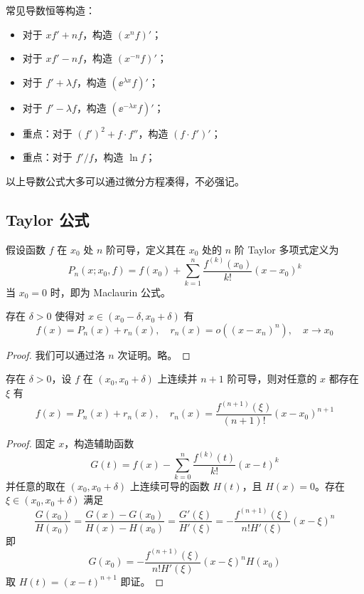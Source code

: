 常见导数恒等构造：
\begin{itemize}
	\item 对于 $x f' + n f$，构造 $(x^n f)'$；
	\item 对于 $xf' - nf$，构造 $(x^{-n} f)'$；
	\item 对于 $f' + \lambda f$，构造 $(\ee^{\lambda x} f)'$；
	\item 对于 $f' - \lambda f$，构造 $(\ee^{-\lambda x} f)'$；
	\item 重点：对于 $(f')^2 + f \cdot f''$，构造 $(f \cdot f')'$；
	\item 重点：对于 $f'/f$，构造 $\ln f$；
\end{itemize}
以上导数公式大多可以通过微分方程凑得，不必强记。

\subsection{Taylor 公式}

假设函数 $f$ 在 $x_0$ 处 $n$ 阶可导，定义其在 $x_0$ 处的 $n$ 阶 Taylor 多项式定义为
\[ P_n(x;x_0, f) = f(x_0) + \sum_{k=1}^{n} \frac{f^{(k)}(x_0)}{k!} (x-x_0)^k \]
当 $x_0 = 0$ 时，即为 Maclaurin 公式。

\begin{theorem}
	存在 $\delta > 0$ 使得对 $x \in (x_0 - \delta, x_0 + \delta)$ 有
	\[ f(x) = P_n(x) + r_n(x), \quad r_n(x) = o((x-x_n)^n), \quad x \to x_0 \]
\end{theorem}

\begin{proof}
	我们可以通过洛 $n$ 次证明。略。
\end{proof}

\begin{theorem}
	存在 $\delta > 0$，设 $f$ 在 $(x_0, x_0+\delta)$ 上连续并 $n + 1$ 阶可导，则对任意的 $x$ 都存在 $\xi$ 有
	\[ f(x) = P_n(x) + r_n(x), \quad r_n(x) = \frac{f^{(n+1)}(\xi)}{(n+1)!}(x-x_0)^{n+1} \]
\end{theorem}

\begin{proof}
	固定 $x$，构造辅助函数
	\[ G(t) = f(x) - \sum_{k=0}^n \frac{f^{(k)}(t)}{k!} (x-t)^k \]
	并任意的取在 $(x_0, x_0 + \delta)$ 上连续可导的函数 $H(t)$，且 $H(x) = 0$。存在 $\xi \in (x_0, x_0 + \delta)$ 满足
	\[ \frac{G(x_0)}{H(x_0)} = \frac{G(x) - G(x_0)}{H(x) - H(x_0)} = \frac{G'(\xi)}{H'(\xi)} = -\frac{f^{(n+1)}(\xi)}{n!H'(\xi)}(x-\xi)^n \]
	即
	\[ G(x_0) = -\frac{f^{(n+1)}(\xi)}{n! H'(\xi)}(x-\xi)^nH(x_0) \]
	取 $H(t) = (x-t)^{n+1}$ 即证。
\end{proof}

